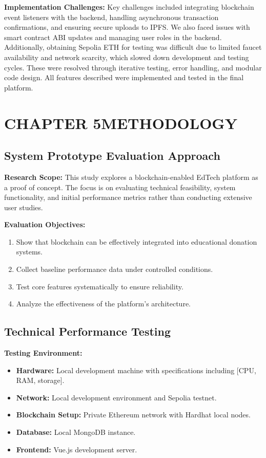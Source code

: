 \documentclass[a4paper,12pt]{report}
\newcommand{\mychapter}[2]{
    \setcounter{chapter}{#1}
    \setcounter{section}{0}
    \setcounter{table}{0}
    \setcounter{figure}{0}
    \chapter*{#2}
    \addcontentsline{toc}{chapter}{#2}
}
\begin{document}
\textbf{Implementation Challenges:}
Key challenges included integrating blockchain event listeners with the backend, handling asynchronous transaction confirmations, and ensuring secure uploads to IPFS. We also faced issues with smart contract ABI updates and managing user roles in the backend. Additionally, obtaining Sepolia ETH for testing was difficult due to limited faucet availability and network scarcity, which slowed down development and testing cycles. These were resolved through iterative testing, error handling, and modular code design. All features described were implemented and tested in the final platform.

\mychapter{5}{CHAPTER 5\quad METHODOLOGY}
\section{System Prototype Evaluation Approach}
\textbf{Research Scope:} This study explores a blockchain-enabled EdTech platform as a proof of concept. The focus is on evaluating technical feasibility, system functionality, and initial performance metrics rather than conducting extensive user studies.

\textbf{Evaluation Objectives:}
\begin{enumerate}
    \item Show that blockchain can be effectively integrated into educational donation systems.
    \item Collect baseline performance data under controlled conditions.
    \item Test core features systematically to ensure reliability.
    \item Analyze the effectiveness of the platform’s architecture.
\end{enumerate}

\section{Technical Performance Testing}
\textbf{Testing Environment:}
\begin{itemize}
    \item \textbf{Hardware:} Local development machine with specifications including [CPU, RAM, storage].
    \item \textbf{Network:} Local development environment and Sepolia testnet.
    \item \textbf{Blockchain Setup:} Private Ethereum network with Hardhat local nodes.
    \item \textbf{Database:} Local MongoDB instance.
    \item \textbf{Frontend:} Vue.js development server.
\end{itemize}
\end{document}
